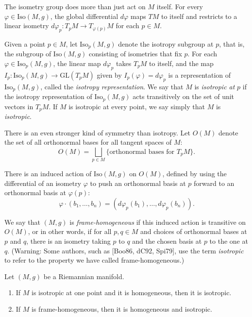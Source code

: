 The isometry group does more than just act on $M$ itself. For every $\varphi \in \mathrm{Iso}(M, g)$, the global differential $d\varphi$ maps $TM$ to itself and restricts to a linear isometry $d\varphi_p : T_pM \to T_{\varphi(p)}M$ for each $p \in M$.

Given a point $p \in M$, let $\mathrm{Iso}_p(M,g)$ denote the isotropy subgroup at $p$, that is, the subgroup of $\mathrm{Iso}(M,g)$ consisting of isometries that fix $p$. For each $\varphi \in \mathrm{Iso}_p(M,g)$, the linear map $d\varphi_p$ takes $T_p M$ to itself, and the map $I_p: \mathrm{Iso}_p(M,g) \to \mathrm{GL}(T_p M)$ given by $I_p(\varphi) = d\varphi_p$ is a representation of $\mathrm{Iso}_p(M,g)$, called the \emph{isotropy representation}. We say that $M$ is \emph{isotropic at} $p$ if the isotropy representation of $\mathrm{Iso}_p(M,g)$ acts transitively on the set of unit vectors in $T_p M$. If $M$ is isotropic at every point, we say simply that $M$ is \emph{isotropic}.

There is an even stronger kind of symmetry than isotropy. Let $O(M)$ denote the set of all orthonormal bases for all tangent spaces of $M$:
\[
O(M) = \bigsqcup_{p \in M} \{\text{orthonormal bases for } T_p M\}.
\]

There is an induced action of $\mathrm{Iso}(M, g)$ on $O(M)$, defined by using the differential of an isometry $\varphi$ to push an orthonormal basis at $p$ forward to an orthonormal basis at $\varphi(p)$:
\begin{equation}
\varphi \cdot (b_1, \ldots, b_n) = (d\varphi_p(b_1), \ldots, d\varphi_p(b_n)).
\tag{3.1}
\end{equation}

We say that $(M,g)$ is \emph{frame-homogeneous} if this induced action is transitive on $O(M)$, or in other words, if for all $p, q \in M$ and choices of orthonormal bases at $p$ and $q$, there is an isometry taking $p$ to $q$ and the chosen basis at $p$ to the one at $q$. (Warning: Some authors, such as [Boo86, dC92, Spi79], use the term \emph{isotropic} to refer to the property we have called frame-homogeneous.)

\begin{proposition}\label{prop:frame-homogeneous-manifolds}
Let $(M, g)$ be a Riemannian manifold.
\begin{enumerate}
\item[(a)] If $M$ is isotropic at one point and it is homogeneous, then it is isotropic.
\item[(b)] If $M$ is frame-homogeneous, then it is homogeneous and isotropic.
\end{enumerate}
\end{proposition}

